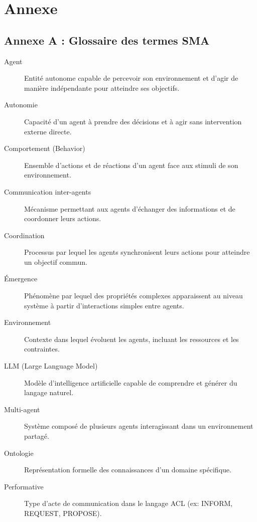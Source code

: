 \chapter{Annexe}
\section{Annexe A : Glossaire des termes SMA}
\begin{description}
    \item[Agent] Entité autonome capable de percevoir son environnement et d'agir de manière indépendante pour atteindre ses objectifs.

    \item[Autonomie] Capacité d'un agent à prendre des décisions et à agir sans intervention externe directe.

    \item[Comportement (Behavior)] Ensemble d'actions et de réactions d'un agent face aux stimuli de son environnement.

    \item[Communication inter-agents] Mécanisme permettant aux agents d'échanger des informations et de coordonner leurs actions.

    \item[Coordination] Processus par lequel les agents synchronisent leurs actions pour atteindre un objectif commun.

    \item[Émergence] Phénomène par lequel des propriétés complexes apparaissent au niveau système à partir d'interactions simples entre agents.

    \item[Environnement] Contexte dans lequel évoluent les agents, incluant les ressources et les contraintes.

    \item[LLM (Large Language Model)] Modèle d'intelligence artificielle capable de comprendre et générer du langage naturel.

    \item[Multi-agent] Système composé de plusieurs agents interagissant dans un environnement partagé.

    \item[Ontologie] Représentation formelle des connaissances d'un domaine spécifique.

    \item[Performative] Type d'acte de communication dans le langage ACL (ex: INFORM, REQUEST, PROPOSE).


\end{description}
